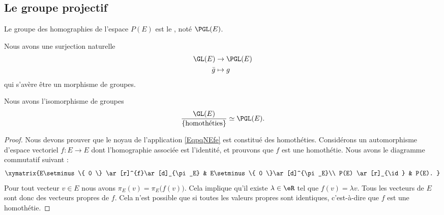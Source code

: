 \subsection{Le groupe projectif}

\begin{definition}      \label{DEFooWUSDooSLVKwV}
    Le groupe des homographies de l'espace \( P(E)\) est le , noté \( \PGL(E)\).
\end{definition}

Nous avons une surjection naturelle
\begin{equation}        \label{EqpqNEfe}
    \begin{aligned}
         \GL(E)&\to \PGL(E) \\
        \bar g&\mapsto g
    \end{aligned}
\end{equation}
qui s'avère être un morphisme de groupes.

\begin{proposition}
    Nous avons l'isomorphisme de groupes
    \begin{equation}
        \frac{ \GL(E) }{\{  \text{homothéties} \}}\simeq \PGL(E).
    \end{equation}

\end{proposition}

\begin{proof}
    Nous devons prouver que le noyau de l'application \eqref{EqpqNEfe} est constitué des homothéties. Considérons un automorphisme d'espace vectoriel \( f\colon E\to E\) dont l'homographie associée est l'identité, et prouvons que \( f\) est une homothétie. Nous avons le diagramme commutatif suivant :
    \begin{equation}
        \xymatrix{%
        E\setminus\{ 0 \} \ar[r]^{f}\ar[d]_{\pi_E}        &   E\setminus\{ 0 \}\ar[d]^{\pi_E}\\
           P(E) \ar[r]_{\id}   &   P(E).
           }
    \end{equation}
    Pour tout vecteur \( v\in E\) nous avons \( \pi_E(v)=\pi_E\big( f(v) \big)\). Cela implique qu'il existe \( \lambda\in\eR\) tel que \( f(v)=\lambda v\). Tous les vecteurs de \( E\) sont donc des vecteurs propres de \( f\). Cela n'est possible que si toutes les valeurs propres sont identiques, c'est-à-dire que \( f\) est une homothétie.
\end{proof}

